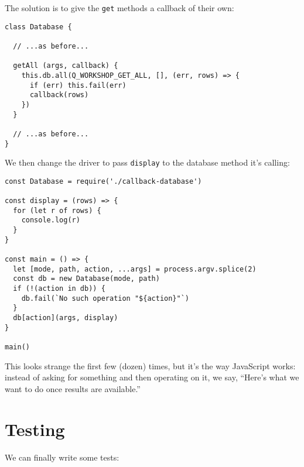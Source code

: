 The solution is to give the \texttt{get} methods a callback of their own:

\begin{verbatim}
class Database {

  // ...as before...

  getAll (args, callback) {
    this.db.all(Q_WORKSHOP_GET_ALL, [], (err, rows) => {
      if (err) this.fail(err)
      callback(rows)
    })
  }

  // ...as before...
}
\end{verbatim}

We then change the driver to pass \texttt{display} to the database method it's calling:

\begin{verbatim}
const Database = require('./callback-database')

const display = (rows) => {
  for (let r of rows) {
    console.log(r)
  }
}

const main = () => {
  let [mode, path, action, ...args] = process.argv.splice(2)
  const db = new Database(mode, path)
  if (!(action in db)) {
    db.fail(`No such operation "${action}"`)
  }
  db[action](args, display)
}

main()
\end{verbatim}

This looks strange the first few (dozen) times,
but it's the way JavaScript works:
instead of asking for something and then operating on it,
we say,
``Here's what we want to do once results are available.''

\section{Testing}\label{s:db-testing}

We can finally write some tests:

